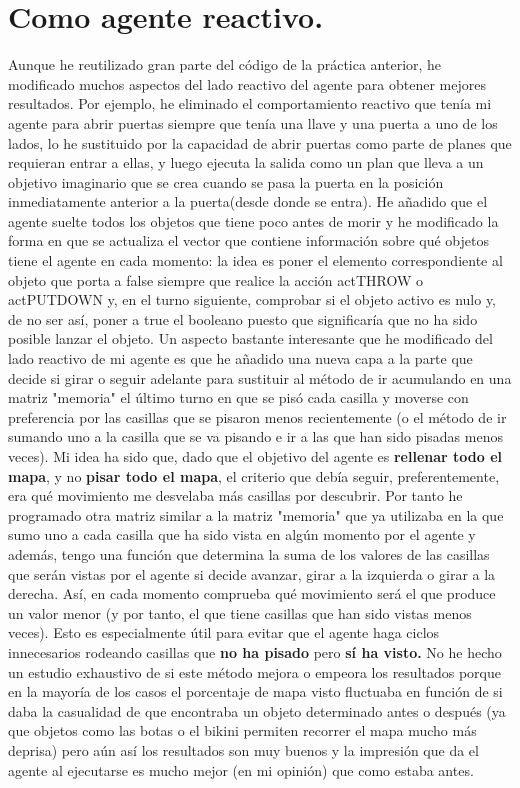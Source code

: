 \documentclass[a4paper, 11pt]{article}
\begin{document}
\section{Como agente reactivo.}
Aunque he reutilizado gran parte del código de la práctica anterior, he modificado muchos aspectos del lado reactivo del agente para obtener mejores resultados. Por ejemplo, he eliminado el comportamiento reactivo que tenía mi agente para abrir puertas siempre que tenía una llave y una puerta a uno de los lados, lo he sustituido por la capacidad de abrir puertas como parte de planes que requieran entrar a ellas, y luego ejecuta la salida como un plan que lleva a un objetivo imaginario que se crea cuando se pasa la puerta en la posición inmediatamente anterior a la puerta(desde donde se entra). He añadido que el agente suelte todos los objetos que tiene poco antes de morir y he modificado la forma en que se actualiza el vector que contiene información sobre qué objetos tiene el agente en cada momento: la idea es poner el elemento correspondiente al objeto que porta a false siempre que realice la acción actTHROW o actPUTDOWN y, en el turno siguiente, comprobar si el objeto activo es nulo y, de no ser así, poner a true el booleano puesto que significaría que no ha sido posible lanzar el objeto.
Un aspecto bastante interesante que he modificado del lado reactivo de mi agente es que he añadido una nueva capa a la parte que decide si girar o seguir adelante para sustituir al método de ir acumulando en una matriz "memoria" el último turno en que se pisó cada casilla y moverse con preferencia por las casillas que se pisaron menos recientemente (o el método de ir sumando uno a la casilla que se va pisando e ir a las que han sido pisadas menos veces). Mi idea ha sido que, dado que el objetivo del agente es \textbf{rellenar todo el mapa}, y no \textbf{pisar todo el mapa}, el criterio que debía seguir, preferentemente, era qué movimiento me desvelaba más casillas por descubrir. Por tanto he programado otra matriz similar a la matriz "memoria" que ya utilizaba en la que sumo uno a cada casilla que ha sido vista en algún momento por el agente y además, tengo una función que determina la suma de los valores de las casillas que serán vistas por el agente si decide avanzar, girar a la izquierda o girar a la derecha. Así, en cada momento comprueba qué movimiento será el que produce un valor menor (y por tanto, el que tiene casillas que han sido vistas menos veces). Esto es especialmente útil para evitar que el agente haga ciclos innecesarios rodeando casillas que \textbf{no ha pisado} pero \textbf{sí ha visto.} No he hecho un estudio exhaustivo de si este método mejora o empeora los resultados porque en la mayoría de los casos el porcentaje de mapa visto fluctuaba en función de si daba la casualidad de que encontraba un objeto determinado antes o después (ya que objetos como las botas o el bikini permiten recorrer el mapa mucho más deprisa) pero aún así los resultados son muy buenos y la impresión que da el agente al ejecutarse es mucho mejor (en mi opinión) que como estaba antes.
\end{document}
